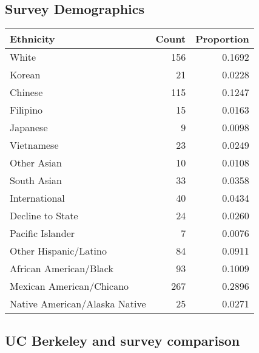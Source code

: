 \documentclass{article}\usepackage[]{graphicx}\usepackage[]{color}
\begin{document}
\subsection{Survey Demographics}
\begin{table}[ht]
\centering
\begin{tabular}{lrr}
  \hline
Ethnicity & Count & Proportion \\ 
  \hline
                         White & 156 & 0.1692 \\ 
                          Korean & 21 & 0.0228 \\ 
                         Chinese & 115 & 0.1247 \\ 
                        Filipino & 15 & 0.0163 \\ 
                        Japanese & 9 & 0.0098 \\ 
                      Vietnamese & 23 & 0.0249 \\ 
                     Other Asian & 10 & 0.0108 \\ 
                     South Asian & 33 & 0.0358 \\ 
                   International & 40 & 0.0434 \\ 
                Decline to State & 24 & 0.0260 \\ 
                Pacific Islander & 7 & 0.0076 \\ 
           Other Hispanic/Latino & 84 & 0.0911 \\ 
          African American/Black & 93 & 0.1009 \\ 
        Mexican American/Chicano & 267 & 0.2896 \\ 
   Native American/Alaska Native & 25 & 0.0271 \\ 
   \hline
\end{tabular}
\end{table}


\subsection{UC Berkeley and survey comparison}
\end{document}

